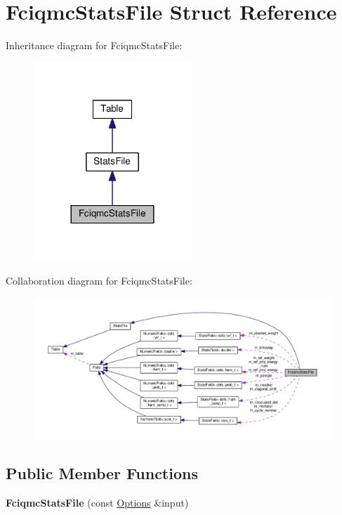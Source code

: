 \hypertarget{structFciqmcStatsFile}{}\section{Fciqmc\+Stats\+File Struct Reference}
\label{structFciqmcStatsFile}


Inheritance diagram for Fciqmc\+Stats\+File\+:
\nopagebreak
\begin{figure}[H]
\begin{center}
\leavevmode
\includegraphics[width=168pt]{structFciqmcStatsFile__inherit__graph}
\end{center}
\end{figure}


Collaboration diagram for Fciqmc\+Stats\+File\+:
\nopagebreak
\begin{figure}[H]
\begin{center}
\leavevmode
\includegraphics[width=350pt]{structFciqmcStatsFile__coll__graph}
\end{center}
\end{figure}
\subsection*{Public Member Functions}
\begin{DoxyCompactItemize}
\item 
{\bfseries Fciqmc\+Stats\+File} (const \hyperlink{structOptions}{Options} \&input)\hypertarget{structFciqmcStatsFile_a077b949e882f2e2d560ef642f2c355bf}{}\label{structFciqmcStatsFile_a077b949e882f2e2d560ef642f2c355bf}

\end{DoxyCompactItemize}
